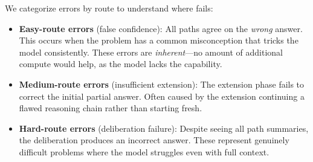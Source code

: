 We categorize errors by route to understand where \method{} fails:

\begin{itemize}[nosep]
\item \textbf{Easy-route errors} (false confidence): All paths agree on the \emph{wrong} answer.
This occurs when the problem has a common misconception that tricks the model consistently.
These errors are \emph{inherent}---no amount of additional compute would help, as the model lacks the capability.

\item \textbf{Medium-route errors} (insufficient extension): The extension phase fails to correct the initial partial answer.
Often caused by the extension continuing a flawed reasoning chain rather than starting fresh.

\item \textbf{Hard-route errors} (deliberation failure): Despite seeing all path summaries, the deliberation produces an incorrect answer.
These represent genuinely difficult problems where the model struggles even with full context.
\end{itemize}
